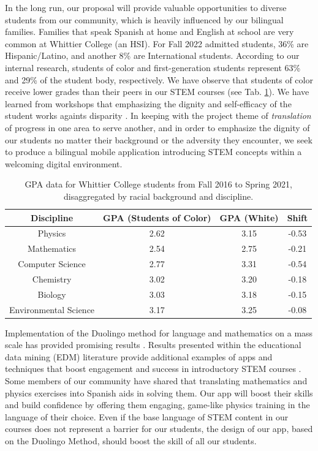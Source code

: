 \documentclass[11pt]{amsart}
\begin{document}
In the long run, our proposal will provide valuable opportunities to diverse students from our community, which is heavily influenced by our bilingual families.  Families that speak Spanish at home and English at school are very common at Whittier College (an HSI).  For Fall 2022 admitted students, 36\% are Hispanic/Latino, and another 8\% are International students.  According to our internal research, students of color and first-generation students represent 63\% and 29\% of the student body, respectively.  We have observe that students of color receive lower grades than their peers in our STEM courses (see Tab. \ref{tab:grades}).  We have learned from workshops that emphasizing the dignity and self-efficacy of the student works againts disparity \cite{cottrell1,cottrell2}.  In keeping with the project theme of \textit{translation} of progress in one area to serve another, and in order to emphasize the dignity of our students no matter their background or the adversity they encounter, we seek to produce a bilingual mobile application introducing STEM concepts within a welcoming digital environment. 

\begin{table}
\centering
\begin{tabular}{c c c c}
Discipline & GPA (Students of Color) & GPA (White) & Shift \\ \hline
Physics & 2.62 & 3.15 & -0.53 \\
Mathematics & 2.54 & 2.75 & -0.21 \\
Computer Science & 2.77 & 3.31 & -0.54 \\
Chemistry & 3.02 & 3.20 & -0.18 \\
Biology & 3.03 & 3.18 & -0.15 \\
Environmental Science & 3.17 & 3.25 & -0.08 \\
\end{tabular}
\caption{\label{tab:grades} GPA data for Whittier College students from Fall 2016 to Spring 2021, disaggregated by racial background and discipline.}
\vspace{-0.5cm}
\end{table}

Implementation of the Duolingo method for language and mathematics on a mass scale has provided promising results \cite{duolingo_whitepaper}.  Results presented within the educational data mining (EDM) literature provide additional examples of apps and techniques that boost engagement and success in introductory STEM courses \cite{edm1,edm2,edm3,edm4}.  Some members of our community have shared that translating mathematics and physics exercises into Spanish aids in solving them.  Our app will boost their skills and build confidence by offering them engaging, game-like physics training in the language of their choice.  Even if the base language of STEM content in our courses does not represent a barrier for our students, the design of our app, based on the Duolingo Method, should boost the skill of all our students. 
\end{document}
